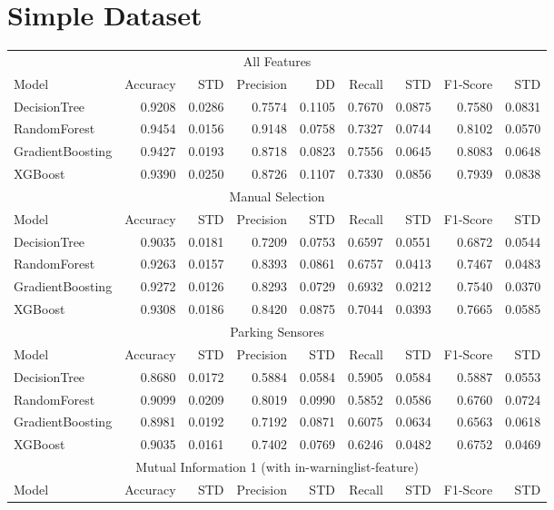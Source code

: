 \documentclass[11pt]{article}
\begin{document}
\section*{Simple Dataset}
\begin{tabular}{l|rr|rr|rr|rr}
	\multicolumn{9}{c}{All Features}\\
	Model & Accuracy & STD & Precision & DD & Recall & STD & F1-Score & STD \\
	\hline
	DecisionTree & 0.9208 & 0.0286 & 0.7574 & 0.1105 & 0.7670 & 0.0875 & 0.7580 & 0.0831 \\
	RandomForest &  0.9454 & 0.0156 & 0.9148 & 0.0758 & 0.7327 & 0.0744 & 0.8102 & 0.0570 \\
	GradientBoosting & 0.9427 & 0.0193 & 0.8718 & 0.0823 & 0.7556 & 0.0645 & 0.8083 & 0.0648 \\
	XGBoost & 0.9390 & 0.0250 & 0.8726 & 0.1107 & 0.7330 & 0.0856 & 0.7939 & 0.0838 \\
	\hline
	\multicolumn{9}{c}{Manual Selection}\\
	Model & Accuracy & STD & Precision & STD & Recall & STD & F1-Score & STD \\
	\hline
	DecisionTree & 0.9035 & 0.0181 & 0.7209 & 0.0753 & 0.6597 & 0.0551 & 0.6872 & 0.0544 \\
	RandomForest &0.9263 & 0.0157 & 0.8393 & 0.0861 & 0.6757 & 0.0413 & 0.7467 & 0.0483 \\
	GradientBoosting & 0.9272 & 0.0126 & 0.8293 & 0.0729 & 0.6932 & 0.0212 & 0.7540 & 0.0370 \\
	XGBoost & 0.9308 & 0.0186 & 0.8420 & 0.0875 & 0.7044 & 0.0393 & 0.7665 & 0.0585 \\
	\hline
	\multicolumn{9}{c}{Parking Sensores}\\
	Model & Accuracy & STD & Precision & STD & Recall & STD & F1-Score & STD \\
	\hline
	DecisionTree & 0.8680 & 0.0172 & 0.5884 & 0.0584 & 0.5905 & 0.0584 & 0.5887 & 0.0553 \\
	RandomForest & 0.9099 & 0.0209 & 0.8019 & 0.0990 & 0.5852 & 0.0586 & 0.6760 & 0.0724 \\
	GradientBoosting & 0.8981 & 0.0192 & 0.7192 & 0.0871 & 0.6075 & 0.0634 & 0.6563 & 0.0618 \\
	XGBoost & 0.9035 & 0.0161 & 0.7402 & 0.0769 & 0.6246 & 0.0482 & 0.6752 & 0.0469 \\
	\hline 
	\multicolumn{9}{c}{Mutual Information 1 (with in-warninglist-feature)}\\
	Model & Accuracy & STD & Precision & STD & Recall & STD & F1-Score & STD \\

\end{tabular}
\end{document}
